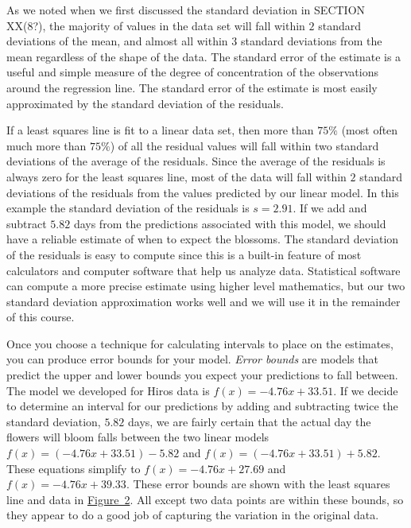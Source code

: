 \documentclass[10pt,]{book}
\theoremstyle{ptxdefinitionnotitle}
\theoremstyle{ptxdefinitiontitle}
\numberwithin{equation}{section}
\begin{document}
\par
\hypertarget{p-131}{}%
As we noted when we first discussed the standard deviation in SECTION XX(8?), the majority of values in the data set will fall within \(2\) standard deviations of the mean, and almost all within \(3\) standard deviations from the mean regardless of the shape of the data.  The standard error of the estimate is a useful and simple measure of the degree of concentration of the observations around the regression line. The standard error of the estimate is most easily approximated by the standard deviation of the residuals.%
\par
\hypertarget{p-132}{}%
If a least squares line is fit to a linear data set, then more than \(75\%\) (most often much more than \(75\%\)) of all the residual values will fall within two standard deviations of the average of the residuals. Since the average of the residuals is always zero for the least squares line, most of the data will fall within \(2\) standard deviations of the residuals from the values predicted by our linear model. In this example the standard deviation of the residuals is \(s = 2.91\). If we add and subtract \(5.82\) days from the predictions associated with this model, we should have a reliable estimate of when to expect the blossoms. The standard deviation of the residuals is easy to compute since this is a built-in feature of most calculators and computer software that help us analyze data. Statistical software can compute a more precise estimate using higher level mathematics, but our two standard deviation approximation works well and we will use it in the remainder of this course.%
\par
\hypertarget{p-133}{}%
Once you choose a technique for calculating intervals to place on the estimates, you can produce error bounds for your model. \emph{Error bounds} are models that predict the upper and lower bounds you expect your predictions to fall between. The model we developed for Hiros data is \(f(x) = -4.76x + 33.51\). If we decide to determine an interval for our predictions by adding and subtracting twice the standard deviation, \(5.82\) days, we are fairly certain that the actual day the flowers will bloom falls between the two linear models \(f(x) = \left( -4.76x + 33.51 \right) - 5.82\) and \(f(x) = \left( -4.76x + 33.51 \right) + 5.82\). These equations simplify to \(f(x) = -4.76x + 27.69\) and \(f(x) =- 4.76x + 39.33\). These error bounds are shown with the least squares line and data in \hyperref[full-cherry-blossom-data-with-errorbounds]{Figure~2}. All except two data points are within these bounds, so they appear to do a good job of capturing the variation in the original data.%
\end{document}
